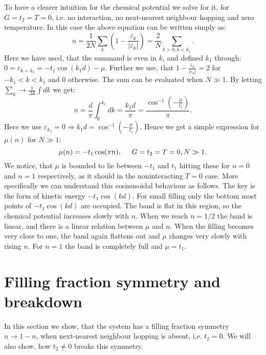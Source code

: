 To have a clearer intuition for the chemical potential we solve for it, for $G = t_2 = T = 0$, i.e. no interaction, no next-nearest neighbour hopping and zero temperature. In this case the above equation can be written simply as:
\begin{equation}
n = \frac{1}{2N}\sum_k \left( 1 - \frac{\varepsilon_k}{|\varepsilon_k|}\right) = \frac{2}{N}\sum_{k > 0, k < k_1}. \nonumber
\end{equation}
Here we have used, that the summand is even in $k$, and defined $k_1$ through: $0 = \varepsilon_{k = k_1} = -t_1\cos(k_1d) - \mu$. Further we use, that $1 - \frac{\varepsilon_k}{|\varepsilon_k|} = 2$ for $-k_1 < k < k_1$ and $0$ otherwise. The sum can be evaluated when $N \gg 1$. By letting $\sum_k \to \frac{1}{\Delta k}\int dk$ we get:
\begin{equation}
n = \frac{d}{\pi}\int_0^{k_1} dk =  \frac{k_1d}{\pi} = \frac{\cos^{-1}\left(-\frac{\mu}{t_1}\right)}{\pi}. \nonumber
\end{equation}
Here we use $\varepsilon_{k_1} = 0 \Rightarrow k_1d = \cos^{-1}\left(-\frac{\mu}{t_1}\right)$. Hence we get a simple expression for $\mu(n)$ for $N\gg 1$:
\begin{equation}
\mu(n) = -t_1\cos(\pi n), \hspace{0.5cm} G = t_2 = T = 0, N\gg 1. 
\label{eq.mun.T0.G0.t20.lattice}
\end{equation}
We notice, that $\mu$ is bounded to lie between $-t_1$ and $t_1$ hitting these for $n = 0$ and $n = 1$ respectively, as it should in the noninteracting $T = 0$ case. More specifically we can understand this cosinusoidal behaviour as follows. The key is the form of kinetic energy $-t_1\cos(kd)$. For small filling only the bottom most points of $-t_1\cos(kd)$ are occupied. The band is flat in this region, so the chemical potential increases slowly with $n$. When we reach $n = 1/2$ the band is linear, and there is a linear relation between $\mu$ and $n$. When the filling becomes very close to one, the band again flattens out and $\mu$ changes very slowly with rising $n$. For $n = 1$ the band is completely full and $\mu = t_1$. 

\section{Filling fraction symmetry and breakdown}
\label{sec.fillingfractionsymmetry.breakdown}
In this section we show, that the system has a filling fraction symmetry $n \to 1 - n$, when next-nearest neighbour hopping is absent, i.e. $t_2 = 0$. We will also show, how $t_2 \neq 0$ breaks this symmetry. 

